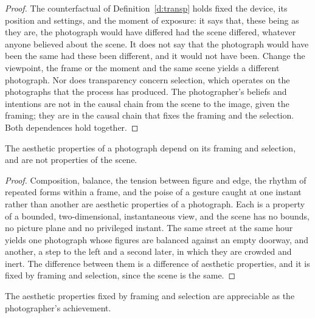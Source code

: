 \documentclass{situationist-preprint}
\begin{document}
\begin{proof}
The counterfactual of Definition~\ref{d:transp} holds fixed the device, its position and settings, and the moment of exposure: it says that, these being as they are, the photograph would have differed had the scene differed, whatever anyone believed about the scene. It does not say that the photograph would have been the same had these been different, and it would not have been. Change the viewpoint, the frame or the moment and the same scene yields a different photograph. Nor does transparency concern selection, which operates on the photographs that the process has produced. The photographer's beliefs and intentions are not in the causal chain from the scene to the image, given the framing; they are in the causal chain that fixes the framing and the selection. Both dependences hold together.
\end{proof}

\begin{lemma}\label{l:aes}
The aesthetic properties of a photograph depend on its framing and selection, and are not properties of the scene.
\end{lemma}

\begin{proof}
Composition, balance, the tension between figure and edge, the rhythm of repeated forms within a frame, and the poise of a gesture caught at one instant rather than another are aesthetic properties of a photograph. Each is a property of a bounded, two-dimensional, instantaneous view, and the scene has no bounds, no picture plane and no privileged instant. The same street at the same hour yields one photograph whose figures are balanced against an empty doorway, and another, a step to the left and a second later, in which they are crowded and inert. The difference between them is a difference of aesthetic properties, and it is fixed by framing and selection, since the scene is the same.
\end{proof}

\begin{lemma}[Attributability]\label{l:attr}
The aesthetic properties fixed by framing and selection are appreciable as the photographer's achievement.
\end{lemma}
\end{document}
